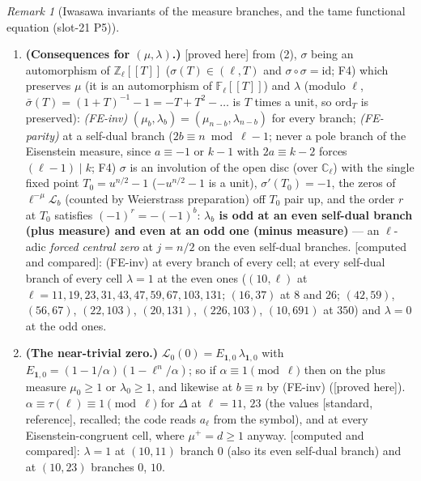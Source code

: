 \documentclass[11pt]{article}
\theoremstyle{remark}
\newtheorem{remark}[theorem]{Remark}
\newcommand{\F}{\mathbb{F}}
\newcommand{\Z}{\mathbb{Z}}
\newcommand{\C}{\mathbb{C}}
\newcommand{\Ga}{\Gamma}
\newcommand{\PROVED}{\textsf{[proved here]}}
\newcommand{\STD}{\textsf{[standard, reference]}}
\newcommand{\CMPD}{\textsf{[computed and compared]}}   %
\begin{document}
\begin{remark}[Iwasawa invariants of the measure branches, and the tame functional equation (slot-21 P5)]
\begin{enumerate}
  $F=\ell^{m}$ (Remark~\ref{rmk:lvwild}(3)): $E_{\chi,j}$ and $\binom nj$ are symmetric under $j\leftrightarrow n-j$, so the difference of the two sides vanishes at the points $\zeta u^{j}-1$, $\zeta$ of $\ell$-power
  order, $\zeta^{-1}u^{n-j}-1=\sigma(\zeta u^{j}-1)$, infinitely many in the open disc; Weierstrass preparation. At level $M$ it holds in $\Z/\ell^{R}[\Ga_u/\Ga_u^{\ell^{M-1}}]$ modulo
  $\ell^{\min(M,R)}$ (\CMPD, every branch of the measure's parity, both signs; the flipped sign fails at every branch with $g_b\not\equiv0$).
\item \textbf{(Consequences for $(\mu,\lambda)$.)} \PROVED{} from (2), $\sigma$ being an automorphism of $\Z_\ell[\![T]\!]$ ($\sigma(T)\in(\ell,T)$ and $\sigma\circ\sigma=\mathrm{id}$; F4) which preserves $\mu$
  (it is an automorphism of $\F_\ell[\![T]\!]$) and $\lambda$ (modulo $\ell$, $\bar\sigma(T)=(1+T)^{-1}-1=-T+T^{2}-\dots$ is $T$ times a unit, so $\mathrm{ord}_T$ is preserved):
  \emph{(FE-inv)} $(\mu_b,\lambda_b)=(\mu_{n-b},\lambda_{n-b})$ for every branch; \emph{(FE-parity)} at a self-dual branch ($2b\equiv n\bmod\ell-1$; never a pole branch of the Eisenstein measure, since $a\equiv-1$ or $k-1$ with $2a\equiv k-2$ forces $(\ell-1)\mid k$; F4) $\sigma$ is an involution of the open disc (over $\C_\ell$) with the single fixed point
  $T_0=u^{n/2}-1$ ($-u^{n/2}-1$ is a unit), $\sigma'(T_0)=-1$, the zeros of $\ell^{-\mu}\mathcal L_b$ (counted by Weierstrass preparation) off $T_0$ pair up, and the order $r$ at $T_0$ satisfies $(-1)^{r}=-(-1)^{b}$: \textbf{$\lambda_b$ is odd at an even self-dual branch
  (plus measure) and even at an odd one (minus measure)} --- an $\ell$-adic \emph{forced central zero} at $j=n/2$ on the even self-dual branches. \CMPD: (FE-inv) at every branch of every cell; at every
  self-dual branch of every cell $\lambda=1$ at the even ones ($(10,\ell)$ at $\ell=11,19,23,31,43,47,59,67,103,131$; $(16,37)$ at $8$ and $26$; $(42,59)$, $(56,67)$, $(22,103)$, $(20,131)$,
  $(226,103)$, $(10,691)$ at $350$) and $\lambda=0$ at the odd ones.
\item \textbf{(The near-trivial zero.)} $\mathcal L_0(0)=E_{\mathbf 1,0}\,\lambda_{\mathbf 1,0}$ with $E_{\mathbf 1,0}=(1-1/\alpha)(1-\ell^{n}/\alpha)$; so if $\alpha\equiv1\pmod\ell$ then on the plus measure
  $\mu_0\ge1$ or $\lambda_0\ge1$, and likewise at $b\equiv n$ by (FE-inv) (\PROVED). $\alpha\equiv\tau(\ell)\equiv1\pmod\ell$ for $\Delta$ at $\ell=11$, $23$ (the values \STD, recalled; the code reads $a_\ell$ from the
  symbol), and at every Eisenstein-congruent cell, where $\mu^{+}=d\ge1$ anyway. \CMPD: $\lambda=1$ at $(10,11)$ branch $0$ (also its even self-dual branch) and at $(10,23)$ branches $0$, $10$.

\end{enumerate}
\end{remark}
\end{document}
